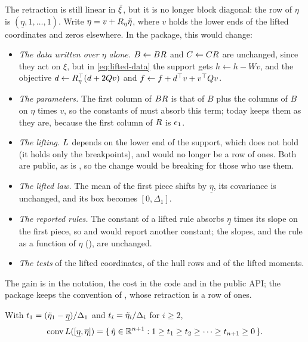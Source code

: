 \begin{remark}
The retraction is still linear in $\tilde\xi$, but it is no longer block diagonal: the row of $\eta$ is $(\underline\eta, 1, \dots, 1)$.
Write $\eta = v + R_\eta\tilde\eta$, where $v$ holds the lower ends of the lifted coordinates and zeros elsewhere.
In the package, this would change:
\begin{itemize}[nosep]
\item \emph{The data written over $\eta$ alone.}
$B \leftarrow BR$ and $C \leftarrow CR$ are unchanged, since they act on $\xi$,
but in \eqref{eq:lifted-data} the support gets $h \leftarrow h - Wv$,
and the objective $d \leftarrow R_\eta^\top(d + 2Qv)$ and $f \leftarrow f + d^\top v + v^\top Q v$.
\item \emph{The parameters.}
The first column of $BR$ is that of $B$ plus the columns of $B$ on $\eta$ times $v$,
so the constants of  must absorb this term;
today  keeps them as they are, because the first column of $R$ is $e_1$.
\item \emph{The lifting.}
$L$ depends on the lower end of the support, which  does not hold (it holds only the breakpoints),
and  would no longer be a row of ones.
Both are public, as is , so the change would be breaking for those who use them.
\item \emph{The lifted law.}
The mean of the first piece shifts by $\underline\eta$, its covariance is unchanged, and its box becomes $[0, \Delta_1]$.
\item \emph{The reported rules.}
The constant of a lifted rule absorbs $\underline\eta$ times its slope on the first piece,
so  and  would report another constant;
the slopes, and the rule as a function of $\eta$ (), are unchanged.
\item \emph{The tests} of the lifted coordinates, of the hull rows and of the lifted moments.
\end{itemize}
The gain is in the notation, the cost in the code and in the public API;
the package keeps the convention of \citet[(3)--(4)]{GWK2015}, whose retraction is a row of ones.
\end{remark}

\begin{lemma}
\label{lem:hull}
With $t_1 = (\tilde\eta_1 - \underline\eta)/\Delta_1$ and $t_i = \tilde\eta_i/\Delta_i$ for $i \ge 2$,
\[
\operatorname{conv} L([\underline\eta, \overline\eta]) = \{\, \tilde\eta \in \mathbb{R}^{n+1} : 1 \ge t_1 \ge t_2 \ge \dots \ge t_{n+1} \ge 0 \,\}.
\]
\end{lemma}

